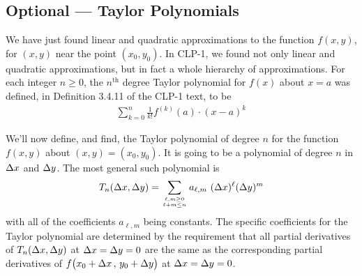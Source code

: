\subsection{Optional --- Taylor Polynomials}\label{sec taylor}
We have just found linear and quadratic approximations
to the function $f(x,y)$, for $(x,y)$ near the point $(x_0,y_0)$.
In CLP-1, we found not only linear and quadratic approximations,
but in fact a whole hierarchy of approximations. For each
integer $n\ge 0$, the $n^\mathrm{th}$ degree Taylor polynomial 
for $f(x)$ about $x=a$ was defined, in Definition 3.4.11 of the CLP-1 text,
to be
\begin{align*}
    \sum_{k=0}^n \frac{1}{k!} f^{(k)}(a) \cdot (x-a)^k
\end{align*}


We'll now define, and find, the Taylor polynomial of degree $n$
for the function $f(x,y)$ about $(x,y)=(x_0,y_0)$. It is going
to be a polynomial of degree $n$ in $\Delta x$ and $\Delta y$. The most
general such polynomial is
\begin{equation*}
T_n(\De x,\De y)
  =\sum_{\Atop{\ell,m\ge 0}{\ell+m\le n}}  a_{\ell,m}\  (\De x)^\ell (\De y)^m
\end{equation*}
with all of the coefficients $a_{\ell,m}$ being constants. The 
specific coefficients for the Taylor polynomial are determined by the
requirement that all partial derivatives of $T_n(\Delta x,\Delta y)$
at $\Delta x=\Delta y=0$ are the same as the corresponding partial derivatives of 
$f\big(x_0 + \Delta x\,,\,y_0+\Delta y\big)$ at $\Delta x=\Delta y=0$. 



